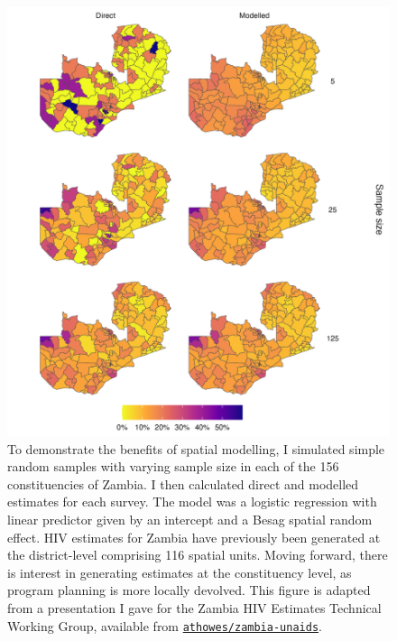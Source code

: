 \documentclass[a4paper, nobind]{templates/ociamthesis}
\begin{document}
\begin{figure}

{\centering \includegraphics[width=0.95\linewidth]{figures/bayesian/zmb-maps} 

}

\caption{To demonstrate the benefits of spatial modelling, I simulated simple random samples with varying sample size in each of the 156 constituencies of Zambia. I then calculated direct and modelled estimates for each survey. The model was a logistic regression with linear predictor given by an intercept and a Besag spatial random effect. HIV estimates for Zambia have previously been generated at the district-level comprising 116 spatial units. Moving forward, there is interest in generating estimates at the constituency level, as program planning is more locally devolved. This figure is adapted from a presentation I gave for the Zambia HIV Estimates Technical Working Group, available from \href{https://github.com/athowes/zambia-unaids}{\texttt{athowes/zambia-unaids}}.}\label{fig:zmb-maps}
\end{figure}
\end{document}
